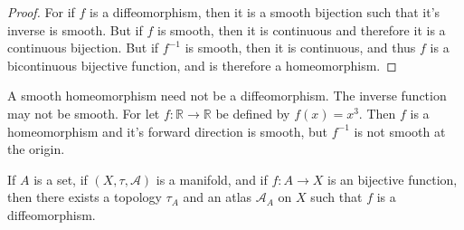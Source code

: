 \documentclass[oneside]{book}                                                  %
\begin{document}
                \begin{proof}
                    For if $f$ is a diffeomorphism, then it is a smooth bijection
                    such that it's inverse is smooth. But if $f$ is smooth, then
                    it is continuous and therefore it is a continuous bijection.
                    But if $f^{\minus{1}}$ is smooth, then it is continuous, and
                    thus $f$ is a bicontinuous bijective function, and is therefore
                    a homeomorphism.
                \end{proof}
                A smooth homeomorphism need not be a diffeomorphism. The inverse
                function may not be smooth. For let
                $f:\mathbb{R}\rightarrow\mathbb{R}$ be defined by $f(x)=x^{3}$.
                Then $f$ is a homeomorphism and it's forward direction is smooth,
                but $f^{\minus{1}}$ is not smooth at the origin.
                \begin{theorem}
                    If $A$ is a set, if $(X,\tau,\mathcal{A})$ is a manifold, and
                    if $f:A\rightarrow{X}$ is an bijective function, then there
                    exists a topology $\tau_{A}$ and an atlas $\mathcal{A}_{A}$
                    on $X$ such that $f$ is a diffeomorphism.
                \end{theorem}
\end{document}
